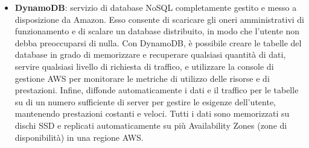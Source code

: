 \begin{itemize}
	\item \textbf{DynamoDB}: servizio di database NoSQL completamente gestito e messo a disposizione da Amazon. Esso consente di scaricare gli oneri amministrativi di funzionamento e di scalare un database distribuito, in modo che l'utente non debba preoccuparsi di nulla.
	Con DynamoDB, è possibile creare le tabelle del database in grado di memorizzare e recuperare qualsiasi quantità di dati, servire qualsiasi livello di richiesta di traffico, e utilizzare la console di gestione AWS per monitorare le metriche di utilizzo delle risorse e di prestazioni. Infine, diffonde automaticamente i dati e il traffico per le tabelle su di un numero sufficiente di server per gestire le esigenze dell'utente, mantenendo prestazioni costanti e veloci. Tutti i dati sono memorizzati su dischi SSD e replicati automaticamente su più Availability Zones (zone di disponibilità) in una regione AWS.
\end{itemize}